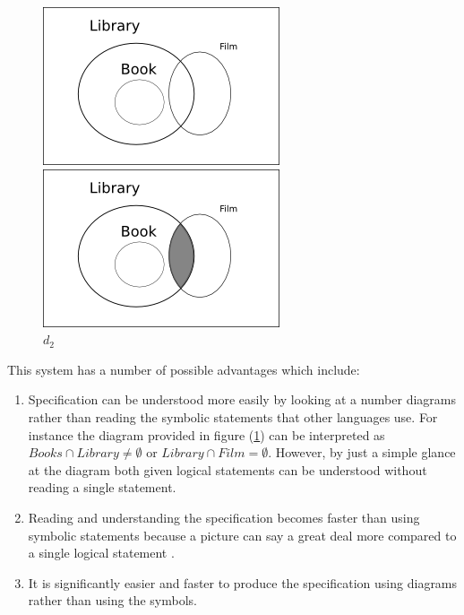 \documentclass[10pt, a4paper, titlepage]{article}
\begin{document}
\begin{figure}[h]
\begin{minipage}[h]{0.5\linewidth}
\centering
\includegraphics[scale=0.7]{images/library1.png}
\caption{$d_{1}$}
\label{fig:lib1}
\end{minipage}
\hspace{0.5cm}
\begin{minipage}[h]{0.5\linewidth}
\centering
\includegraphics[scale=0.7]{images/library2.png}
\caption{$d_{2}$}
\label{fig:lib2}
\end{minipage}
\end{figure}

 
This system has a number of possible advantages which include:
\begin{enumerate}
\item Specification can be understood more easily by looking at a number diagrams rather than reading the symbolic statements that other languages use. For instance the diagram provided in figure (\ref{fig:lib2}) can be interpreted as $ Books \cap Library \neq \emptyset $  or $ Library \cap Film = \emptyset$. However, by just a simple glance at the diagram both given logical statements can be understood without reading a single statement. 
\item Reading and understanding the specification becomes faster than using symbolic statements because a picture can say a great deal more compared to a single logical statement .
\item It is significantly easier and faster to produce the specification using diagrams rather than using the symbols.
\end{enumerate}
\end{document}
